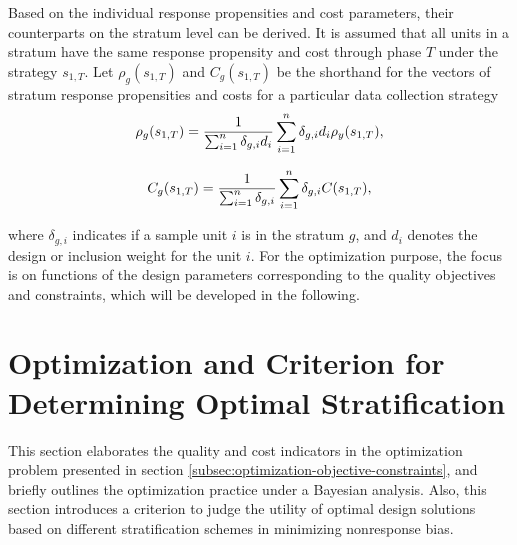 \documentclass[12pt]{article}
\begin{document}
Based on the individual response propensities and cost parameters, their counterparts on the stratum level can be derived.
It is assumed that all units in a stratum have the same response propensity and cost through phase $T$ under the strategy $s_{1,T}$.
Let $\rho_g(s_{1,T})$ and $C_g(s_{1,T})$ be the shorthand for the vectors of stratum response propensities and costs for a particular data collection strategy
\let\saveeqnno\theequation
\let\savefrac\frac
\def\dispfrac{\displaystyle\savefrac}
\begin{eqnarray}
\let\frac\dispfrac
\gdef\theequation{11}
\let\theHequation\theequation
\label{equation-rho-stratum}
	\rho_{g}(s_{1,T})=\dfrac{1}{\sum^n_{i=1}\delta_{g,i}d_i}\sum^n_{i=1}\delta_{g,i}d_i\rho_{y}(s_{1,T}),
\end{eqnarray}
\global\let\theequation\saveeqnno
\addtocounter{equation}{-1}\ignorespaces

\let\saveeqnno\theequation
\let\savefrac\frac
\def\dispfrac{\displaystyle\savefrac}
\begin{eqnarray}
\let\frac\dispfrac
\gdef\theequation{12}
\let\theHequation\theequation
\label{equation-cost-stratum}
	C_{g}(s_{1,T})=\dfrac{1}{\sum^n_{i=1}\delta_{g,i}}\sum^n_{i=1}\delta_{g,i}C(s_{1,T}),
\end{eqnarray}
\global\let\theequation\saveeqnno
\addtocounter{equation}{-1}\ignorespaces

where $\delta_{g,i}$ indicates if a sample unit $i$ is in the stratum $g$, and $d_i$ denotes the design or inclusion weight for the unit $i$.
For the optimization purpose, the focus is on functions of the design parameters corresponding to the quality objectives and constraints, which will be developed in the following.


\section{Optimization and Criterion for Determining Optimal Stratification}
\label{sec:optimization-criterion-determining-optimal-stratification}

This section elaborates the quality and cost indicators in the optimization problem presented in section \ref{subsec:optimization-objective-constraints}, and briefly outlines the optimization practice under a Bayesian analysis. Also, this section introduces a criterion to judge the utility of optimal design solutions based on different stratification schemes in minimizing nonresponse bias.
\end{document}
